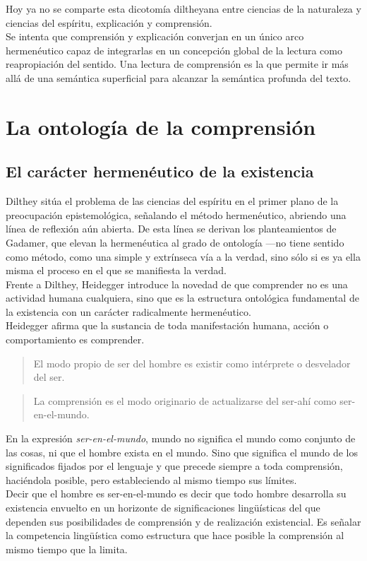 \documentclass[a4paper, 11pt, twocolumn, spanish]{article}
\begin{document}
Hoy ya no se comparte esta dicotomía diltheyana entre ciencias de la
naturaleza y ciencias del espíritu, explicación y comprensión.\\[0pt]
Se intenta que comprensión y explicación converjan en un único arco
hermenéutico capaz de integrarlas en un concepción global de la
lectura como reapropiación del sentido. Una lectura de comprensión es
la que permite ir más allá de una semántica superficial para alcanzar
la semántica profunda del texto.


\section{La ontología de la comprensión}
\label{sec:orgaa150da}
\subsection{El carácter hermenéutico de la existencia}
\label{sec:org3e74d91}
Dilthey sitúa el problema de las ciencias del espíritu en el primer
plano de la preocupación epistemológica, señalando el método
hermenéutico, abriendo una línea de reflexión aún abierta. De esta
línea se derivan los planteamientos de Gadamer, que elevan la
hermenéutica al grado de ontología —no tiene sentido como método, como
una simple y extrínseca vía a la verdad, sino sólo si es ya ella misma
el proceso en el que se manifiesta la verdad.\\[0pt]

Frente a Dilthey, Heidegger introduce la novedad de que comprender no
es una actividad humana cualquiera, sino que es la estructura
ontológica fundamental de la existencia con un carácter radicalmente
hermenéutico.\\[0pt]
Heidegger afirma que la sustancia de toda manifestación humana, acción
o comportamiento es comprender.
\begin{quote}
El modo propio de ser del hombre es existir como intérprete o
desvelador del ser.
\end{quote}
\begin{quote}
La comprensión es el modo originario de actualizarse del ser-ahí como
ser-en-el-mundo.
\end{quote}

En la expresión \emph{ser-en-el-mundo}, mundo no significa el mundo como
conjunto de las cosas, ni que el hombre exista en el mundo. Sino que
significa el mundo de los significados fijados por el lenguaje y que
precede siempre a toda comprensión, haciéndola posible, pero
estableciendo al mismo tiempo sus límites.\\[0pt]
Decir que el hombre es ser-en-el-mundo es decir que todo hombre
desarrolla su existencia envuelto en un horizonte de significaciones
lingüísticas del que dependen sus posibilidades de comprensión y de
realización existencial. Es señalar la competencia lingüística como
estructura que hace posible la comprensión al mismo tiempo que la
limita.
\end{document}
